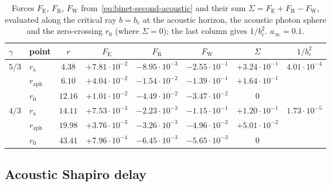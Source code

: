 \documentclass[12pt,a4paper,preprint]{elsarticle}
\begin{document}
            \begin{table}[htb]
                \centering
                \caption{Forces $F_{\mathrm{E}}$, $F_{\mathrm{R}}$, $F_{\mathrm{W}}$ from~\eqref{eq:binet-second-acoustic} and their sum $\Sigma=F_{\mathrm{E}}+F_{\mathrm{R}}-F_{\mathrm{W}}$, evaluated along the critical ray $b=b_{\mathrm{c}}$ at the acoustic horizon, the acoustic photon sphere and the zero-crossing $r_{0}$ (where $\Sigma=0$); the last column gives $1/b_{\mathrm{c}}^{2}$. $a_{\infty}=0.1$.}
                \label{tab:phonon-forces}
                {\small
                \setlength{\tabcolsep}{4.5pt}
                \begin{tabular}{llcccccc}
                    \toprule
                    $\gamma$ & point & $r$ & $F_{\mathrm{E}}$ & $F_{\mathrm{R}}$ & $F_{\mathrm{W}}$ & $\Sigma$ & $1/b^{2}_{\mathrm{c}}$ \\
                    \midrule
                    \multirow{3}{*}{$5/3$}
                    & $r_{\mathrm{a}}$   & $4.38$  & $+7.81\cdot 10^{-2}$ & $-8.95\cdot 10^{-3}$ & $-2.55\cdot 10^{-1}$ & $+3.24\cdot 10^{-1}$ & \multirow{3}{*}{$4.01\cdot 10^{-4}$} \\
                    & $r_{\mathrm{aph}}$ & $6.10$  & $+4.04\cdot 10^{-2}$ & $-1.54\cdot 10^{-2}$ & $-1.39\cdot 10^{-1}$ & $+1.64\cdot 10^{-1}$ & \\
                    & $r_{0}$          & $12.16$ & $+1.01\cdot 10^{-2}$ & $-4.49\cdot 10^{-2}$ & $-3.47\cdot 10^{-2}$ & $0$ & \\
                    \midrule
                    \multirow{3}{*}{$4/3$}
                    & $r_{\mathrm{a}}$   & $14.11$ & $+7.53\cdot 10^{-3}$ & $-2.23\cdot 10^{-3}$ & $-1.15\cdot 10^{-1}$ & $+1.20\cdot 10^{-1}$ & \multirow{3}{*}{$1.73\cdot 10^{-5}$} \\
                    & $r_{\mathrm{aph}}$ & $19.98$ & $+3.76\cdot 10^{-3}$ & $-3.26\cdot 10^{-3}$ & $-4.96\cdot 10^{-2}$ & $+5.01\cdot 10^{-2}$ & \\
                    & $r_{0}$          & $43.41$ & $+7.96\cdot 10^{-4}$ & $-6.45\cdot 10^{-3}$ & $-5.65\cdot 10^{-3}$ & $0$ & \\
                    \bottomrule
                \end{tabular}
                }
            \end{table}

        \subsection{Acoustic Shapiro delay}\label{subsec:shapiro-delay}
\end{document}
